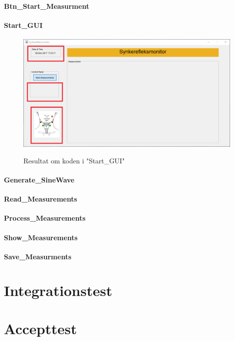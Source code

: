 \subsubsection{Btn\_Start\_Measurment}



\subsubsection{Start\_GUI} 

\begin{figure}[H] 
\centering
{\includegraphics[width=\linewidth]
{Figure/modultestGUI}}
\caption{Resultat om koden i "Start\_GUI"}
\label{fig:aafiltermodultest}
\end{figure}


\subsubsection{Generate\_SineWave} 





\subsubsection{Read\_Measurements}


\subsubsection{Process\_Measurements} 





\subsubsection{Show\_Measurements} 


\subsubsection{Save\_Measurments} 









\chapter{Integrationstest}


\chapter{Accepttest}






\citep{Aroom2009}


